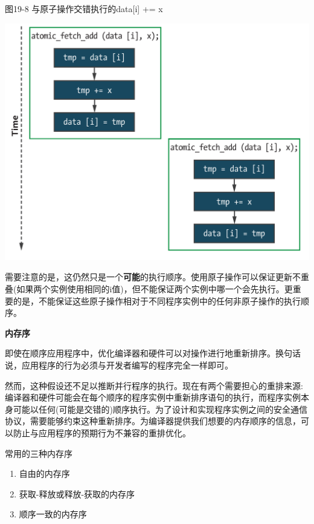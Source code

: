 \hspace*{\fill} \par %
图19-8 与原子操作交错执行的data[i] += x
\begin{center}
	\includegraphics[width=1.0\textwidth]{content/chapter-19/images/5}
\end{center}

需要注意的是，这仍然只是一个\textbf{可能}的执行顺序。使用原子操作可以保证更新不重叠(如果两个实例使用相同的i值)，但不能保证两个实例中哪一个会先执行。更重要的是，不能保证这些原子操作相对于不同程序实例中的任何非原子操作的执行顺序。\par

\hspace*{\fill} \par %
\textbf{内存序}

即使在顺序应用程序中，优化编译器和硬件可以对操作进行地重新排序。换句话说，应用程序的行为必须与开发者编写的程序完全一样即可。\par

然而，这种假设还不足以推断并行程序的执行。现在有两个需要担心的重排来源:编译器和硬件可能会在每个顺序的程序实例中重新排序语句的执行，而程序实例本身可能以任何(可能是交错的)顺序执行。为了设计和实现程序实例之间的安全通信协议，需要能够约束这种重新排序。为编译器提供我们想要的内存顺序的信息，可以防止与应用程序的预期行为不兼容的重排优化。\par

常用的三种内存序\par

\begin{enumerate}
	\item 自由的内存序
	\item 获取-释放或释放-获取的内存序
	\item 顺序一致的内存序
\end{enumerate}

